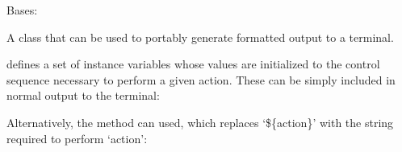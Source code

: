 \documentclass[letterpaper,10pt,english]{sphinxmanual}
\begin{document}
\begin{fulllineitems}
\label{\detokenize{pgamit.classes:pgamit.classes.pyTerminal.TerminalController}}
\pysigstartsignatures
\pysiglinewithargsret
{}
{}
{}
\pysigstopsignatures
\sphinxAtStartPar
Bases: 

\sphinxAtStartPar
A class that can be used to portably generate formatted output to
a terminal.

\sphinxAtStartPar
{} defines a set of instance variables whose
values are initialized to the control sequence necessary to
perform a given action.  These can be simply included in normal
output to the terminal:

\begin{sphinxVerbatim}[commandchars=\\\{\}]
  
 
\end{sphinxVerbatim}

\sphinxAtStartPar
Alternatively, the  method can used, which replaces
‘\$\{action\}’ with the string required to perform ‘action’:

\begin{sphinxVerbatim}[commandchars=\\\{\}]
  
 
\end{sphinxVerbatim}


\end{fulllineitems}
\end{document}
